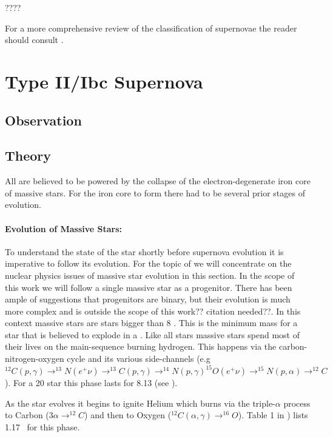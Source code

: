 ???? 

For a more comprehensive review of the classification of supernovae the reader should consult \citet{2003LNP...598...21T, 2007AIPC..937..187T}.

\section{Type II/Ibc Supernova}
\subsection{Observation}

\subsection{Theory}
All \snii are believed to be powered by the collapse of the electron-degenerate iron core of massive stars. For the iron core to form there had to be several prior stages of evolution.

\paragraph{Evolution of Massive Stars:}  To understand the state of the star shortly before supernova evolution it is imperative to follow its evolution. For the topic of \snii we will concentrate on the nuclear physics issues of massive star evolution in this section. In the scope of this work we will follow a single massive star as a progenitor. There has been ample of suggestions that \snii progenitors are binary, but their evolution is much more complex and is outside the scope of this work?? citation needed??.  In this context massive stars are stars bigger than 8 \msun. This is the minimum mass for a star that is believed to explode in a \snii. Like all stars massive stars spend most of their lives on the main-sequence burning hydrogen. This happens via the carbon-nitrogen-oxygen cycle and its various side-channels (e.g $^{12}C(p,\gamma)\rightarrow^{13}N(e^+\nu)\rightarrow^{13}C(p,\gamma)\rightarrow^{14}N(p,\gamma)^{15}O(e^+\nu)\rightarrow^{15}N(p,\alpha)\rightarrow^{12}C$). For a 20 \msun star this phase lasts for 8.13 \myr (see \citet{2002RvMP...74.1015W}).

As the star evolves it begins to ignite Helium which burns via the triple-$\alpha$ process to Carbon ($3\alpha\rightarrow^{12}C$) and then to Oxygen ($^{12}C(\alpha,\gamma)\rightarrow^{16}O$). Table 1 in \citet{2002RvMP...74.1015W}) lists 1.17 \myr\ for this phase. 


